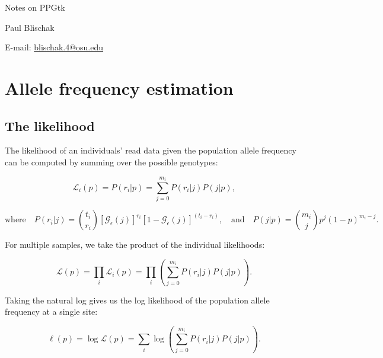 \documentclass[11pt,english,letterpaper,oneside]{article}
\begin{document}
\pagestyle{empty}


	{\huge Notes on PPGtk}
	\vspace{0.2in}
	
	Paul Blischak
	
	E-mail: \href{mailto:blischak.4@osu.edu}{blischak.4@osu.edu}
	\vspace{0.2in}
		
\tableofcontents

\newpage

\clearpage
\pagestyle{plain}
\setcounter{page}{1}



\section{Allele frequency estimation}


\subsection{The likelihood}

The likelihood of an individuals' read data given the population allele frequency can be computed by summing over the possible genotypes:

\begin{equation}
\mathcal{L}_i(p) = P(r_i|p) = \sum_{j = 0}^{m_i} P(r_i|j)P(j|p),
\end{equation}

\begin{equation*}
\text{where} \quad P(r_i|j) = \binom{t_i}{r_i}[\mathcal{G}_\epsilon(j)]^{r_i} [1 - \mathcal{G}_\epsilon(j)]^{(t_i - r_i)}, \quad \text{and} \quad P(j|p) = \binom{m_i}{j} p^j (1 - p)^{m_i - j}.
\end{equation*}

For multiple samples, we take the product of the individual likelihoods:

\begin{equation}
\mathcal{L}(p) = \prod_i \mathcal{L}_i(p) = \prod_i \left(\sum_{j = 0}^{m_i} P(r_i|j)P(j|p)\right).
\end{equation}

Taking the natural log gives us the log likelihood of the population allele frequency at a single site:

\begin{equation}
\ell(p) = \log \mathcal{L}(p) = \sum_i \log \left( \sum_{j = 0}^{m_i} P(r_i|j)P(j|p)\right).
\end{equation}
\end{document}
